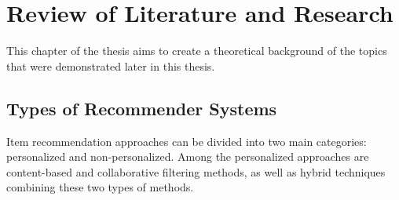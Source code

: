 
\chapter{Review of Literature and Research}\label{chapter:review_of_research}

This chapter of the thesis aims to create a theoretical background of the topics that were demonstrated later in this thesis.

\section{Types of Recommender Systems}

Item recommendation approaches can be divided into two main categories: personalized and non-personalized. Among the personalized approaches are content-based and collaborative filtering methods, as well as hybrid techniques combining these two types of methods.


